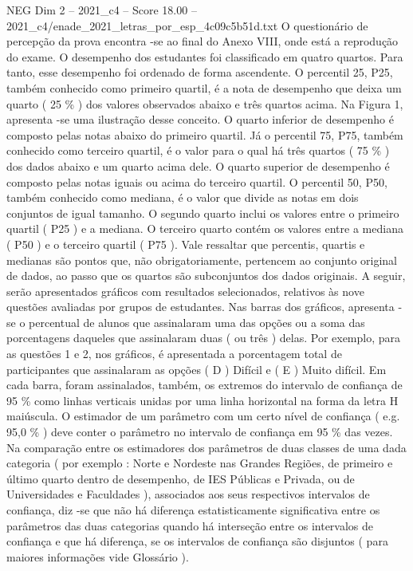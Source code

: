 \begin{textsample}{NEG Dim 2 – 2021\_c4 – Score 18.00 – 2021\_c4/enade\_2021\_letras\_por\_esp\_4c09c5b51d.txt}
O questionário de percepção da prova encontra -se ao final do Anexo VIII, onde está a reprodução do exame.
O desempenho dos estudantes foi classificado em quatro quartos.
Para tanto, esse desempenho foi ordenado de forma ascendente.
O percentil 25, P25, também conhecido como primeiro quartil, é a nota de desempenho que deixa um quarto ( 25 \% ) dos valores observados abaixo e três quartos acima.
Na Figura 1, apresenta -se uma ilustração desse conceito.
O quarto inferior de desempenho é composto pelas notas abaixo do primeiro quartil.
Já o percentil 75, P75, também conhecido como terceiro quartil, é o valor para o qual há três quartos ( 75 \% ) dos dados abaixo e um quarto acima dele.
O quarto superior de desempenho é composto pelas notas iguais ou acima do terceiro quartil.
O percentil 50, P50, também conhecido como mediana, é o valor que divide as notas em dois conjuntos de igual tamanho.
O segundo quarto inclui os valores entre o primeiro quartil ( P25 ) e a mediana.
O terceiro quarto contém os valores entre a mediana ( P50 ) e o terceiro quartil ( P75 ).
Vale ressaltar que percentis, quartis e medianas são pontos que, não obrigatoriamente, pertencem ao conjunto original de dados, ao passo que os quartos são subconjuntos dos dados originais.
A seguir, serão apresentados gráficos com resultados selecionados, relativos às nove questões avaliadas por grupos de estudantes.
Nas barras dos gráficos, apresenta -se o percentual de alunos que assinalaram uma das opções ou a soma das porcentagens daqueles que assinalaram duas ( ou três ) delas.
Por exemplo, para as questões 1 e 2, nos gráficos, é apresentada a porcentagem total de participantes que assinalaram as opções ( D ) Difícil e ( E ) Muito difícil.
Em cada barra, foram assinalados, também, os extremos do intervalo de confiança de 95 \% como linhas verticais unidas por uma linha horizontal na forma da letra H maiúscula.
O estimador de um parâmetro com um certo nível de confiança ( e.g. 95,0 \% ) deve conter o parâmetro no intervalo de confiança em 95 \% das vezes.
Na comparação entre os estimadores dos parâmetros de duas classes de uma dada categoria ( por exemplo : Norte e Nordeste nas Grandes Regiões, de primeiro e último quarto dentro de desempenho, de IES Públicas e Privada, ou de Universidades e Faculdades ), associados aos seus respectivos intervalos de confiança, diz -se que não há diferença estatisticamente significativa entre os parâmetros das duas categorias quando há interseção entre os intervalos de confiança e que há diferença, se os intervalos de confiança são disjuntos ( para maiores informações vide Glossário ).

\end{textsample}
